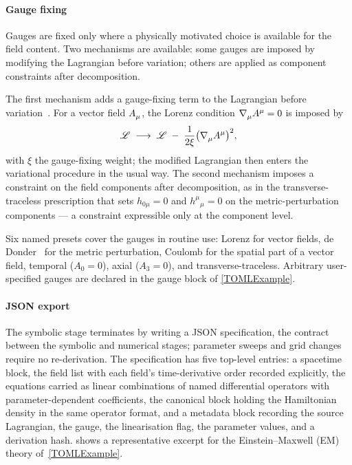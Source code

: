\paragraph*{Gauge fixing}%
\label{GaugeFixing}
Gauges are fixed only where a physically motivated choice
is available for the field content.
Two mechanisms are available: some gauges are imposed by modifying the
Lagrangian before variation; others are applied as component constraints after
decomposition.

The first mechanism adds a gauge-fixing term to the Lagrangian before
variation~\cite{faddeev1967feynman}.
For a vector field $\FieldA{_\mu}$, the Lorenz condition
$\rcD{_\mu}\FieldA{^\mu} = 0$ is imposed by
\begin{align}
  \lag \;\longrightarrow\;
  \lag \;-\; \frac{1}{2\xi}\bigl(\rcD{_\mu}\FieldA{^\mu}\bigr)^{2},
  \label{LorenzGauge}
\end{align}
with $\xi$ the gauge-fixing weight; the modified Lagrangian then enters the variational
procedure in the usual way.
The second mechanism imposes a constraint on the field components
after decomposition, as in the transverse-traceless prescription that
sets $h_{0\mu} = 0$ and $h^\mu{}_\mu = 0$ on the metric-perturbation
components --- a constraint expressible only at the component level.

Six named presets cover the gauges in routine use: Lorenz for vector
fields, de Donder~\cite{wald1984general} for the metric perturbation,
Coulomb for the spatial part of a vector field, temporal
($A_0 = 0$), axial ($A_3 = 0$), and transverse-traceless.
Arbitrary user-specified gauges are declared in the gauge block of
\cref{TOMLExample}.

\paragraph*{JSON export}
The symbolic stage terminates by writing a JSON specification,
the contract between the symbolic and numerical stages; parameter sweeps
and grid changes require no re-derivation.
The specification has five top-level entries: a spacetime block, the
field list with each field's time-derivative order recorded
explicitly, the equations carried as linear combinations of named
differential operators with parameter-dependent coefficients, the
canonical block holding the Hamiltonian density in the same operator
format, and a metadata block recording the source Lagrangian, the
gauge, the linearisation flag, the parameter values, and a derivation
hash.
 shows a representative excerpt for the
Einstein--Maxwell (EM) theory of~\cref{TOMLExample}.

